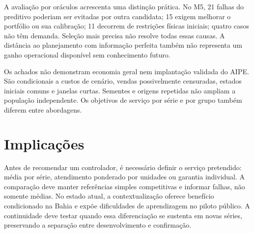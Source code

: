 A avaliação por oráculos acrescenta uma distinção prática. No M5, 21 falhas do preditivo poderiam ser evitadas por outra candidata; 15 exigem melhorar o portfólio ou sua calibração; 11 decorrem de restrições físicas iniciais; quatro casos não têm demanda. Seleção mais precisa não resolve todas essas causas. A distância ao planejamento com informação perfeita também não representa um ganho operacional disponível sem conhecimento futuro.

Os achados não demonstram economia geral nem implantação validada do AIPE. São condicionais a custos de cenário, vendas possivelmente censuradas, estados iniciais comuns e janelas curtas. Sementes e origens repetidas não ampliam a população independente. Os objetivos de serviço por série e por grupo também diferem entre abordagens.

\section{Implicações}
Antes de recomendar um controlador, é necessário definir o serviço pretendido: média por série, atendimento ponderado por unidades ou garantia individual. A comparação deve manter referências simples competitivas e informar falhas, não somente médias. No estado atual, a contextualização oferece benefício condicionado na Bahia e expõe dificuldades de aprendizagem no piloto público. A continuidade deve testar quando essa diferenciação se sustenta em novas séries, preservando a separação entre desenvolvimento e confirmação.
